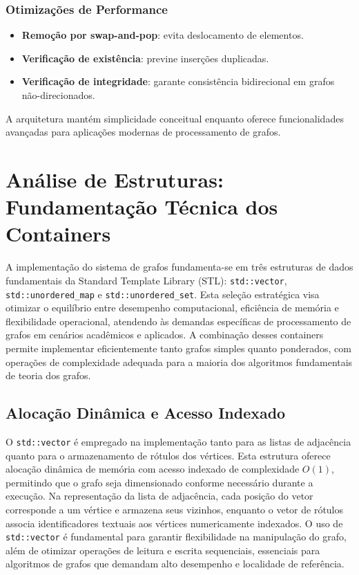 \documentclass{sbc2023}%
\begin{document}
\subsubsection*{Otimizações de Performance}
\begin{itemize}
    \item \textbf{Remoção por swap-and-pop}: evita deslocamento de elementos.
    \item \textbf{Verificação de existência}: previne inserções duplicadas.
    \item \textbf{Verificação de integridade}: garante consistência bidirecional em grafos não-direcionados.
\end{itemize}

A arquitetura mantém simplicidade conceitual enquanto oferece funcionalidades avançadas para aplicações modernas de processamento de grafos.


\section{Análise de Estruturas: Fundamentação Técnica dos Containers}
\label{sec:structures}

A implementação do sistema de grafos fundamenta-se em três estruturas de dados fundamentais da Standard Template Library (STL): \texttt{std::vector}, \texttt{std::unordered\_map} e \texttt{std::unordered\_set}. Esta seleção estratégica visa otimizar o equilíbrio entre desempenho computacional, eficiência de memória e flexibilidade operacional, atendendo às demandas específicas de processamento de grafos em cenários acadêmicos e aplicados. A combinação desses containers permite implementar eficientemente tanto grafos simples quanto ponderados, com operações de complexidade adequada para a maioria dos algoritmos fundamentais de teoria dos grafos.

\subsection{Alocação Dinâmica e Acesso Indexado}

O \texttt{std::vector} é empregado na implementação tanto para as listas de adjacência quanto para o armazenamento de rótulos dos vértices. Esta estrutura oferece alocação dinâmica de memória com acesso indexado de complexidade \(O(1)\), permitindo que o grafo seja dimensionado conforme necessário durante a execução. Na representação da lista de adjacência, cada posição do vetor corresponde a um vértice e armazena seus vizinhos, enquanto o vetor de rótulos associa identificadores textuais aos vértices numericamente indexados. O uso de \texttt{std::vector} é fundamental para garantir flexibilidade na manipulação do grafo, além de otimizar operações de leitura e escrita sequenciais, essenciais para algoritmos de grafos que demandam alto desempenho e localidade de referência.
\end{document}
